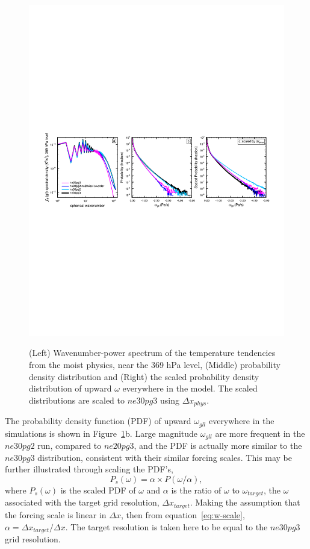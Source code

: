 \documentclass{agujournal}
\begin{document}
\begin{figure}[t]
\begin{center}
\noindent\includegraphics[width=30pc,angle=0]{figs/panel_ne20pg2-ne30pg2-ne30pg3.pdf}\\
\end{center}
\caption{(Left) Wavenumber-power spectrum of the temperature tendencies from the moist physics, near the 369 hPa level, (Middle) probability density distribution and (Right) the scaled probability density distribution of upward $\omega$ everywhere in the model. The scaled distributions are scaled to $ne30pg3$ using $\Delta x_{phys}$.}
\label{fig:pgXpanel-lores}
\end{figure}

The probability density function (PDF) of upward $\omega_{gll}$ everywhere in the simulations is shown in Figure~\ref{fig:pgXpanel-lores}b. Large magnitude $\omega_{gll}$ are more frequent in the $ne30pg2$ run, compared to $ne20pg3$, and the PDF is actually more similar to the $ne30pg3$ distribution, consistent with their similar forcing scales. This may be further illustrated through scaling the PDF's,
\begin{equation}
P_{s}(\omega) = \alpha \times P(\omega/\alpha),\label{eq:pdf}
\end{equation}
where $P_{s}(\omega)$ is the scaled PDF of $\omega$ and $\alpha$ is the ratio of $\omega$ to $\omega_{target}$, the $\omega$ associated with the target grid resolution, $\Delta x_{target}$. Making the assumption that the forcing scale is linear in $\Delta x$, then from equation~\ref{eq:w-scale}, $\alpha = \Delta x_{target}/\Delta x$. The target resolution is taken here to be equal to the $ne30pg3$ grid resolution. 
\end{document}
